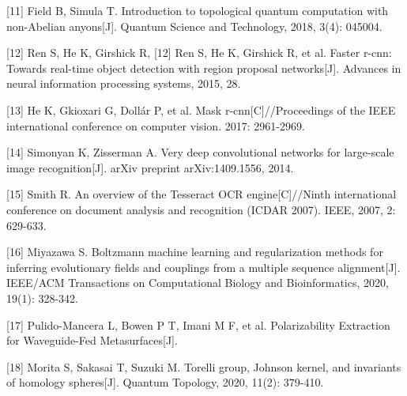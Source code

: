 \documentclass[
]{article}
\begin{document}
{[}11{]} Field B, Simula T. Introduction to topological quantum
computation with non-Abelian anyons{[}J{]}. Quantum Science and
Technology, 2018, 3(4): 045004.

{[}12{]} Ren S, He K, Girshick R, {[}12{]} Ren S, He K, Girshick R, et
al. Faster r-cnn: Towards real-time object detection with region
proposal networks{[}J{]}. Advances in neural information processing
systems, 2015, 28.

{[}13{]} He K, Gkioxari G, Dollár P, et al. Mask
r-cnn{[}C{]}//Proceedings of the IEEE international conference on
computer vision. 2017: 2961-2969.

{[}14{]} Simonyan K, Zisserman A. Very deep convolutional networks for
large-scale image recognition{[}J{]}. arXiv preprint arXiv:1409.1556,
2014.

{[}15{]} Smith R. An overview of the Tesseract OCR engine{[}C{]}//Ninth
international conference on document analysis and recognition (ICDAR
2007). IEEE, 2007, 2: 629-633.

{[}16{]} Miyazawa S. Boltzmann machine learning and regularization
methods for inferring evolutionary fields and couplings from a multiple
sequence alignment{[}J{]}. IEEE/ACM Transactions on Computational
Biology and Bioinformatics, 2020, 19(1): 328-342.

{[}17{]} Pulido-Mancera L, Bowen P T, Imani M F, et al. Polarizability
Extraction for Waveguide-Fed Metasurfaces{[}J{]}.

{[}18{]} Morita S, Sakasai T, Suzuki M. Torelli group, Johnson kernel,
and invariants of homology spheres{[}J{]}. Quantum Topology, 2020,
11(2): 379-410.
\end{document}
